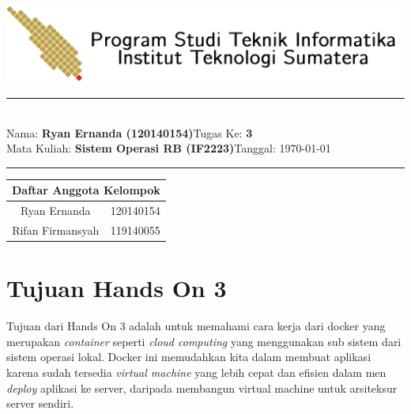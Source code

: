 \documentclass[11pt,a4paper]{article}
\newcommand{\stuid}{120140154}
\newcommand{\student}{\textbf{Ryan Ernanda (\stuid{})}}
\newcommand{\course}{\textbf{Sistem Operasi RB (IF2223)}}
\newcommand{\assignment}{\textbf{3}} %
\begin{document}
\thispagestyle{empty}
\begin{center}
	\includegraphics[scale = 0.15]{Figure/ifitera-header.png}
	\vspace{0.1cm}
\end{center}
\noindent
{\large
\rule{17cm}{0.2cm}\\[0.3cm]
Nama: \student \hfill Tugas Ke: \assignment\\[0.1cm]
Mata Kuliah: \course \hfill Tanggal: \today\\
\rule{17cm}{0.05cm}
\vspace{0.1cm}
}


\begin{center}
\begin{tabular}{ |c|c| }
 \hline
 \multicolumn{2}{|c|}{\textbf{Daftar Anggota Kelompok}} \\
 \hline
 Ryan Ernanda & 120140154\\ 
 Rifan Firmansyah & 119140055 \\
 \hline
\end{tabular}
\end{center}
\section{Tujuan Hands On 3}
Tujuan dari Hands On 3 adalah untuk memahami cara kerja dari docker yang merupakan \textit{container} seperti \textit{cloud computing} yang menggunakan sub sistem dari sistem operasi lokal. Docker ini memudahkan kita dalam membuat aplikasi karena sudah tersedia \textit{virtual machine} yang lebih cepat dan efisien dalam men \textit{deploy} aplikasi ke server, daripada membangun virtual machine untuk arsiteksur server sendiri.
\end{document}
